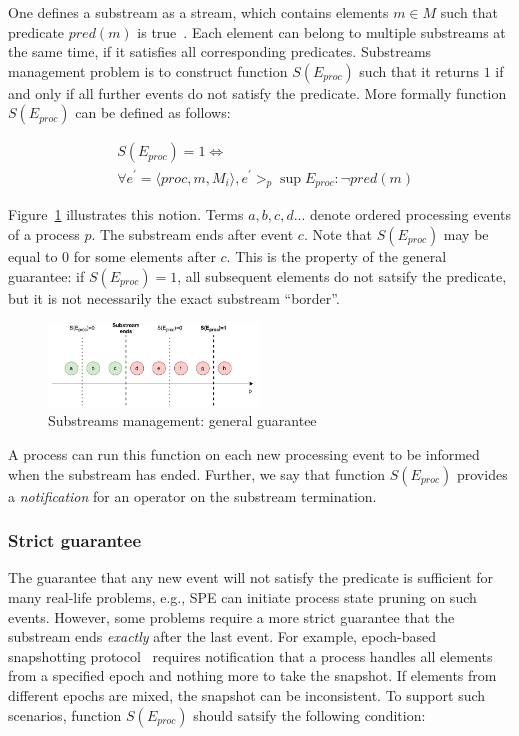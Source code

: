 One defines a substream as a stream, which contains elements $m \in M$ such that predicate $pred(m)$ is true~\cite{Tucker:2003:EPS:776752.776780}. Each element can belong to multiple substreams at the same time, if it satisfies all corresponding predicates. Substreams management problem is to construct function $S(E_{proc})$ such that it returns $1$ if and only if all further events do not satisfy the predicate. More formally function $S(E_{proc})$ can be defined as follows:

\begin{align*}
& S(E_{proc}) = 1 \Longleftrightarrow \\ 
& \forall e^{'} = \langle proc,m,M_i\rangle, e^{'} >_p \sup E_{proc} : \neg pred(m)
\end{align*} 

Figure~\ref{general_guarantees} illustrates this notion. Terms $a,b,c,d...$ denote ordered processing events of a process $p$. The substream ends after event $c$. Note that $S(E_{proc})$ may be equal to $0$ for some elements after $c$. This is the property of the general guarantee: if $S(E_{proc})=1$, all subsequent elements do not satsify the predicate, but it is not necessarily the exact substream ``border''.

\begin{figure}[htbp]
  \centering
  \includegraphics[width=0.50\textwidth]{pics/general-guarantee.pdf}
  \caption{Substreams management: general guarantee}
  \label{general_guarantees}
\end{figure}

A process can run this function on each new processing event to be informed when the substream has ended. Further, we say that function $S(E_{proc})$ provides a {\em notification} for an operator on the substream termination.

\subsubsection{Strict guarantee}

The guarantee that any new event will not satisfy the predicate is sufficient for many real-life problems, e.g., SPE can initiate process state pruning on such events. However, some problems require a more strict guarantee that the substream ends {\em exactly} after the last event. For example, epoch-based snapshotting protocol~\cite{2015arXiv150608603C, jacques2016consistent} requires notification that a process handles all elements from a specified epoch and nothing more to take the snapshot. If elements from different epochs are mixed, the snapshot can be inconsistent. To support such scenarios, function $S(E_{proc})$ should satsify the following condition:

